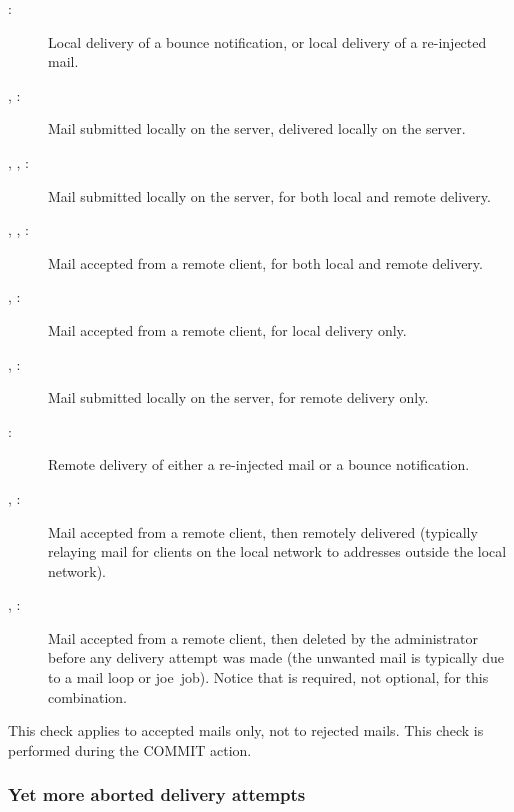\begin{description}

    \item [:] Local delivery of a bounce notification, or
        local delivery of a re-injected mail.

    \item [, :] Mail submitted locally on the
        server, delivered locally on the server.

    \item [, , :] Mail submitted
        locally \newline{} on the server, for both local and remote
        delivery.

    \item [, , :] Mail accepted
        from a remote client, for both local and remote delivery.

    \item [, :] Mail accepted from a remote
        client, for local delivery only.

    \item [, :] Mail submitted locally on the
        server, for remote delivery only.

    \item [:] Remote delivery of either a re-injected mail or
        a bounce notification.

    \item [, :] Mail accepted from a remote
        client, then remotely delivered (typically relaying mail for
        clients on the local network to addresses outside the local
        network).

    \item [, :] Mail accepted from a remote
        client, then deleted by the administrator before any delivery
        attempt was made (the unwanted mail is typically due to a mail loop
        or joe~job).  Notice that  is required, not
        optional, for this combination.

\end{description}

This check applies to accepted mails only, not to rejected mails.  This
check is performed during the COMMIT action.

\subsubsection{Yet more aborted delivery attempts}

